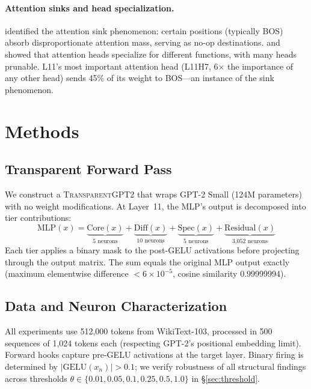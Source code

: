 \documentclass{article}
\begin{document}
\paragraph{Attention sinks and head specialization.}
\citet{xiao2023efficient} identified the attention sink phenomenon: certain
positions (typically BOS) absorb disproportionate attention mass, serving as
no-op destinations.
\citet{clark2019what} and \citet{voita2019analyzing} showed that attention
heads specialize for different functions, with many heads prunable.
L11's most important attention head (L11H7, 6$\times$ the importance
of any other head) sends 45\% of its weight to BOS---an instance of the
sink phenomenon.

\section{Methods}

\subsection{Transparent Forward Pass}

We construct a \textsc{TransparentGPT2} that wraps GPT-2 Small (124M parameters)
with no weight modifications.
At Layer~11, the MLP's output is decomposed into tier contributions:
\begin{equation}
\text{MLP}(x) = \underbrace{\text{Core}(x)}_{\text{5 neurons}} +
\underbrace{\text{Diff}(x)}_{\text{10 neurons}} +
\underbrace{\text{Spec}(x)}_{\text{5 neurons}} +
\underbrace{\text{Residual}(x)}_{\text{3,052 neurons}}
\end{equation}
Each tier applies a binary mask to the post-GELU activations before projecting
through the output matrix.
The sum equals the original MLP output exactly
(maximum elementwise difference $< 6 \times 10^{-5}$,
cosine similarity 0.99999994).

\subsection{Data and Neuron Characterization}

All experiments use 512,000 tokens from WikiText-103, processed in 500 sequences
of 1,024 tokens each (respecting GPT-2's positional embedding limit).
Forward hooks capture pre-GELU activations at the target layer.
Binary firing is determined by $|\text{GELU}(x_n)| > 0.1$;
we verify robustness of all structural findings across thresholds
$\theta \in \{0.01, 0.05, 0.1, 0.25, 0.5, 1.0\}$ in \S\ref{sec:threshold}.
\end{document}
